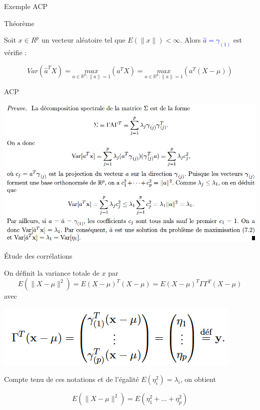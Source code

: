 \documentclass[10pt]{beamer}
\begin{document}
\begin{frame}{ Exemple ACP }

\begin{block}{Théorème}

Soit $x \in R^p$ un vecteur aléatoire tel que $E(\parallel  x \parallel) < \infty$. Alors  \textcolor{blue}{$\hat{a}= \gamma_{(1)}$} est
vérifie : 

 $$ Var(\hat{a}^TX)=\underset{a \in \mathbb{R}^p : \parallel a \parallel=1}{max} (a^TX)=\underset{a \in \mathbb{R}^p : \parallel a \parallel=1}{max} (a^T(X-\mu)) $$ 
 
\end{block}

\end{frame}



\begin{frame}{ACP }

\includegraphics[scale=0.37]{Thee.png}

\end{frame}


\begin{frame}{Étude des corrélations }

 On définit la variance totale de $x$ par $$ E(\parallel  X-\mu\parallel^2)=E(X-\mu)^T(X-\mu)=E(X-\mu)^T\Gamma\Gamma^T (X-\mu)$$ avec 
 
 \centering 
 \includegraphics[scale=0.5]{Gamma.png}
 
 Compte tenu de ces notations et de l’égalité 
 $E(\eta_i^2) = \lambda_i$, on obtient 
 
$$ E(\parallel  X-\mu\parallel^2)=E(\eta_1^2+\ldots +\eta_p^2)$$ 

\end{frame}
\end{document}
